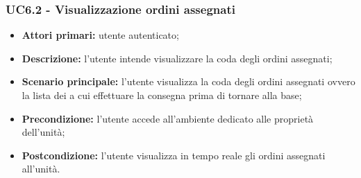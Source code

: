         \subsubsection{UC6.2 - Visualizzazione ordini assegnati}
        \begin{itemize}
            \item \textbf{Attori primari:} utente autenticato;
            \item \textbf{Descrizione:} l'utente intende visualizzare la coda degli ordini assegnati;
            \item \textbf{Scenario principale:} l'utente visualizza la coda degli ordini assegnati ovvero la lista dei  a cui effettuare la consegna prima di tornare alla base;
            \item \textbf{Precondizione:} l'utente accede all'ambiente dedicato alle proprietà dell'unità;
            \item \textbf{Postcondizione:} l'utente visualizza in tempo reale gli ordini assegnati all'unità.
        \end{itemize}


